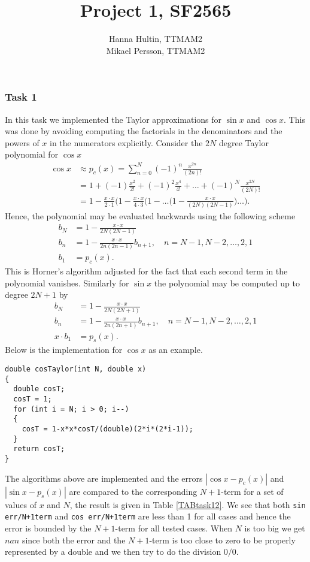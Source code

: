\documentclass[a4paper,10pt]{article}
\title{Project 1, SF2565}
\author{Hanna Hultin, TTMAM2 \\ Mikael Persson, TTMAM2}
\begin{document}
\maketitle

\subsubsection*{Task 1}
In this task we implemented the Taylor approximations for $\sin x$ and $\cos x$.
This was done by avoiding computing the factorials in the denominators and the powers of $x$ in the numerators explicitly.
Consider the $2N$ degree Taylor polynomial for  $\cos x$
\begin{align*}
  \cos x &\approx p_c(x) = \sum_{n=0}^{N} (-1)^n \frac{x^{2n}}{(2n)!} \\ 
  \quad &= 1 + (-1) \frac{x^2}{2!} + (-1)^2 \frac{x^4}{4!} + \dots + (-1)^N \frac{x^{2N}}{(2N)!}
  \\
  &= 1 - \frac{x\cdot x}{2\cdot 1} \Big(1 - \frac{x \cdot x}{ 4 \cdot 3} \Big( 
  1 - \dots \Big(1- \frac{x \cdot x}{(2N)(2N-1)}\Big)\dots \Big).
\end{align*}
Hence, the polynomial may be evaluated backwards using the following scheme
\begin{align*}
  b_N &= 1-\frac{x \cdot x}{2N(2N-1)} \\
  b_n &= 1-\frac{x\cdot x}{2n(2n-1)}b_{n+1},\quad n = N-1,N-2,\dots,2,1 \\
  b_1 &= p_c(x).
\end{align*}
This is Horner's algorithm adjusted for the fact that each second term in the polynomial vanishes.
Similarly for $\sin x$ the polynomial may be computed up to degree $2N+1$ by
\begin{align*}
  b_N &= 1-\frac{x \cdot x}{2N(2N+1)} \\
  b_n &= 1-\frac{x\cdot x}{2n(2n+1)}b_{n+1},\quad n = N-1,N-2,\dots,2,1 \\
  x\cdot b_1 &= p_s(x).
\end{align*}
Below is the implementation for $\cos x$ as an example.
\begin{center}
\begin{minipage}[t]{85mm}
\begin{lstlisting}
double cosTaylor(int N, double x) 
{
  double cosT;
  cosT = 1;
  for (int i = N; i > 0; i--)
  {
    cosT = 1-x*x*cosT/(double)(2*i*(2*i-1));
  }
  return cosT;
}
\end{lstlisting}
\end{minipage}
\end{center}
The algorithms above are implemented and the errors 
$|\cos x - p_c(x)|$ and $|\sin x - p_s (x)|$ are 
compared to the corresponding $N+1$-term for a set of values of $x$ and $N$, the result is given
in Table \ref{TABtask12}. We see that both \texttt{sin err/N+1term} and \texttt{cos err/N+1term} are less than 1 for all cases and hence the error is bounded by the $N+1$-term for all tested cases. When $N$ is too big we get $nan$ since both the error and the $N+1$-term is too close to zero to be properly represented by a double and we then try to do the division $0/0$.
\end{document}
